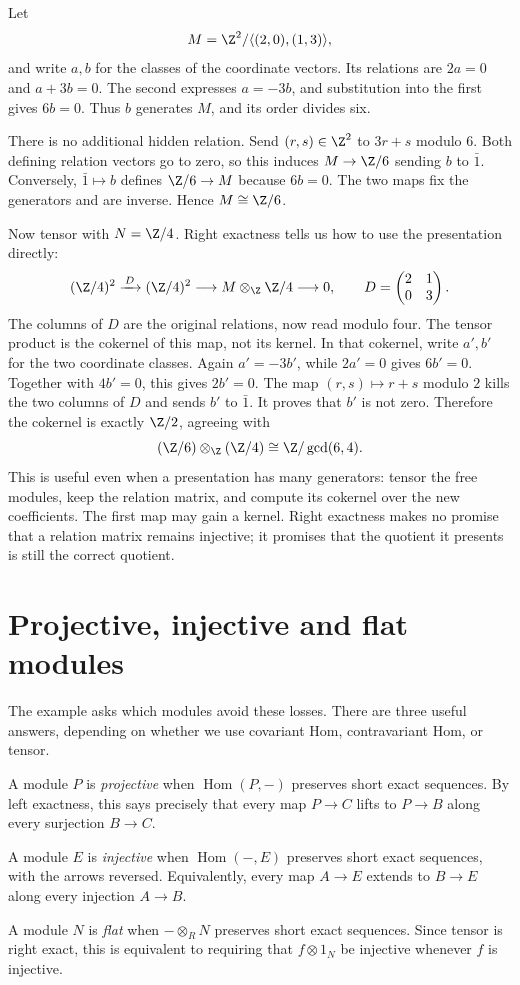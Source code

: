 Let
\[
M=\Z^2/\langle(2,0),(1,3)\rangle,
\]
and write $a,b$ for the classes of the coordinate vectors. Its relations are $2a=0$ and $a+3b=0$. The second expresses $a=-3b$, and substitution into the first gives $6b=0$. Thus $b$ generates $M$, and its order divides six.

There is no additional hidden relation. Send $(r,s)\in\Z^2$ to $3r+s$ modulo $6$. Both defining relation vectors go to zero, so this induces $M\to\Z/6$ sending $b$ to $\bar1$. Conversely, $\bar1\mapsto b$ defines $\Z/6\to M$ because $6b=0$. The two maps fix the generators and are inverse. Hence $M\cong\Z/6$.

Now tensor with $N=\Z/4$. Right exactness tells us how to use the presentation directly:
\[
(\Z/4)^2\xrightarrow{\,D\,}(\Z/4)^2
 \longrightarrow M\otimes_\Z\Z/4\longrightarrow0,
\qquad D=\begin{pmatrix}2&1\\0&3\end{pmatrix}.
\]
The columns of $D$ are the original relations, now read modulo four. The tensor product is the cokernel of this map, not its kernel. In that cokernel, write $a',b'$ for the two coordinate classes. Again $a'=-3b'$, while $2a'=0$ gives $6b'=0$. Together with $4b'=0$, this gives $2b'=0$. The map $(r,s)\mapsto r+s$ modulo $2$ kills the two columns of $D$ and sends $b'$ to $\bar1$. It proves that $b'$ is not zero. Therefore the cokernel is exactly $\Z/2$, agreeing with
\[
(\Z/6)\otimes_\Z(\Z/4)\cong\Z/\gcd(6,4).
\]
This is useful even when a presentation has many generators: tensor the free modules, keep the relation matrix, and compute its cokernel over the new coefficients. The first map may gain a kernel. Right exactness makes no promise that a relation matrix remains injective; it promises that the quotient it presents is still the correct quotient.

\section{Projective, injective and flat modules}

The example asks which modules avoid these losses. There are three useful answers, depending on whether we use covariant Hom, contravariant Hom, or tensor.

\begin{definition}\label{def:projective}
A module $P$ is \emph{projective} when $\operatorname{Hom}(P,-)$ preserves short exact sequences. By left exactness, this says precisely that every map $P\to C$ lifts to $P\to B$ along every surjection $B\to C$.

A module $E$ is \emph{injective} when $\operatorname{Hom}(-,E)$ preserves short exact sequences, with the arrows reversed. Equivalently, every map $A\to E$ extends to $B\to E$ along every injection $A\to B$.

A module $N$ is \emph{flat} when $-\otimes_RN$ preserves short exact sequences. Since tensor is right exact, this is equivalent to requiring that $f\otimes1_N$ be injective whenever $f$ is injective.
\end{definition}

